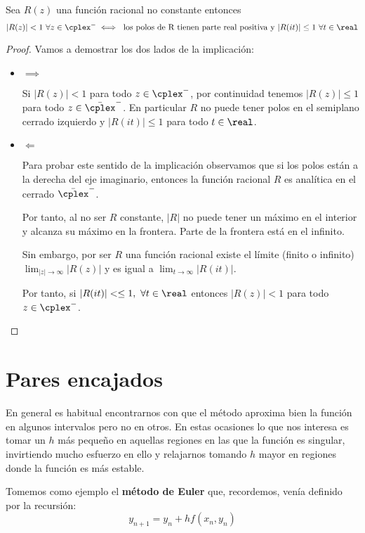 \begin{lemma}\label{lemma:a-estable}
Sea $R(z)$ una función racional no constante entonces
\[|R(z)| < 1 \ \forall z \in \cplex^- \iff \text{ los polos de R tienen parte real positiva y } |R(it)| \leq 1 \ \forall t \in \real\]
\end{lemma}
\begin{proof}
Vamos a demostrar los dos lados de la implicación:
\begin{itemize}
\item $\implies$

Si $|R(z)|<1$ para todo $z \in \cplex^-$, por continuidad tenemos $|R(z)|\leq 1$ para todo $z \in \bar{\cplex}^-$. En particular $R$ no puede tener polos en el semiplano cerrado izquierdo y $|R(it)|\leq 1$ para todo $t \in \real$.

\item $\Longleftarrow$

Para probar este sentido de la implicación observamos que si los polos están a la derecha del eje imaginario, entonces la función racional $R$ es analítica en el cerrado $\bar{\cplex}^-$.

Por tanto, al no ser $R$ constante, $|R|$ no puede tener un máximo en el interior y alcanza su máximo en la frontera. Parte de la frontera está en el infinito.

Sin embargo, por ser $R$ una función racional existe el límite (finito o infinito) $\lim_{|z|\to \infty}|R(z)|$ y es igual a $\lim_{t \to \infty}|R(it)|$.

Por tanto, si $|R(it)|<\leq 1, \ \forall t \in \real$ entonces $|R(z)|<1$ para todo $z \in \cplex^-$.

\end{itemize}
\end{proof}

\section{Pares encajados}

En general es habitual encontrarnos con que el método aproxima bien la función en algunos intervalos pero no en otros. En estas ocasiones lo que nos interesa es tomar un $h$ más pequeño en aquellas regiones en las que la función es singular, invirtiendo mucho esfuerzo en ello y relajarnos tomando $h$ mayor en regiones donde la función es más estable.

Tomemos como ejemplo el \textbf{método de Euler} que, recordemos, venía definido por la recursión:
\[y_{n+1} = y_n + h f(x_n,y_n)\]

